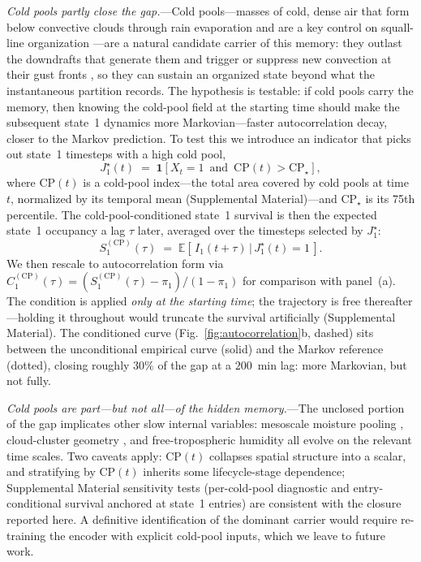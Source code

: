 \documentclass[
    aps,
    prl,
    reprint,
    superscriptaddress,
    amsmath,amssymb,
    floatfix,
    nofootinbib
]{revtex4-2}
\begin{document}
\emph{Cold pools partly close the gap.}---Cold pools---masses of cold, dense air that form below convective clouds through rain evaporation and are a key control on squall-line organization \cite{rotunno1988theory, houze1977structure, tompkins2001coldpools, abramian2022shear}---are a natural candidate carrier of this memory: they outlast the downdrafts that generate them and trigger or suppress new convection at their gust fronts \cite{torri2015mechanisms}, so they can sustain an organized state beyond what the instantaneous partition records. The hypothesis is testable: if cold pools carry the memory, then knowing the cold-pool field at the starting time should make the subsequent state~1 dynamics more Markovian---faster autocorrelation decay, closer to the Markov prediction. To test this we introduce an indicator that picks out state~1 timesteps with a high cold pool,
\begin{equation}
J_1^\star(t) \;=\; \mathbf{1}\!\left[X_t = 1 \,\text{ and }\, \mathrm{CP}(t) > \mathrm{CP}_\star\right],
\end{equation}
where $\mathrm{CP}(t)$ is a cold-pool index---the total area covered by cold pools at time $t$, normalized by its temporal mean (Supplemental Material)---and $\mathrm{CP}_\star$ is its 75th percentile. The cold-pool-conditioned state~1 survival is then the expected state~1 occupancy a lag $\tau$ later, averaged over the timesteps selected by $J_1^\star$:
\begin{equation}
S^{(\mathrm{CP})}_1(\tau) \;=\; \mathbb{E}\!\left[\,I_1(t+\tau) \,\big|\, J_1^\star(t) = 1\,\right].
\end{equation}
We then rescale to autocorrelation form via $C^{(\mathrm{CP})}_1(\tau) = (S^{(\mathrm{CP})}_1(\tau) - \pi_1)/(1-\pi_1)$ for comparison with panel~(a). The condition is applied \emph{only at the starting time}; the trajectory is free thereafter---holding it throughout would truncate the survival artificially (Supplemental Material). The conditioned curve (Fig.~\ref{fig:autocorrelation}b, dashed) sits between the unconditional empirical curve (solid) and the Markov reference (dotted), closing roughly $30\%$ of the gap at a $200$~min lag: more Markovian, but not fully.

\emph{Cold pools are part---but not all---of the hidden memory.}---The unclosed portion of the gap implicates other slow internal variables: mesoscale moisture pooling \cite{mapes2011parameterizing}, cloud-cluster geometry \cite{hwong2023assessing}, and free-tropospheric humidity all evolve on the relevant time scales. Two caveats apply: $\mathrm{CP}(t)$ collapses spatial structure into a scalar, and stratifying by $\mathrm{CP}(t)$ inherits some lifecycle-stage dependence; Supplemental Material sensitivity tests (per-cold-pool diagnostic and entry-conditional survival anchored at state~1 entries) are consistent with the closure reported here. A definitive identification of the dominant carrier would require re-training the encoder with explicit cold-pool inputs, which we leave to future work.
\end{document}

